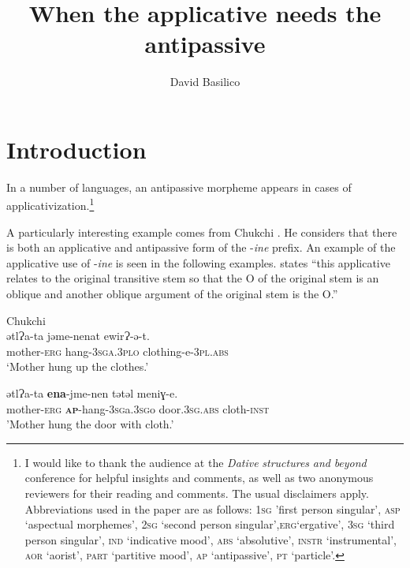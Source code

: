 \documentclass[output=paper,modfonts,nonflat,newtxmath]{langsci/langscibook}
\author{David Basilico\affiliation{University of Alabama at Birmingham}}
\title{When the applicative needs the antipassive}
\begin{document}
\maketitle  


\section{Introduction} %

In a number of languages, an antipassive morpheme appears in cases of applicativization.\footnote{I would like to thank the audience at the \textit{Dative} \textit{structures} \textit{and} \textit{beyond} conference for helpful insights and comments, as well as two anonymous reviewers for their reading and comments. The usual disclaimers apply. Abbreviations used in the paper are as follows:
1\textsc{sg} 'first person singular', \textsc{asp} `aspectual morphemes', \textsc{2sg} `second person singular',\textsc{erg}`ergative', \textsc{3sg} `third person singular', \textsc{ind} `indicative mood', \textsc{abs} `absolutive', \textsc{instr} `instrumental', \textsc{aor} `aorist', {\textsc{part}} `partitive mood', {\textsc{ap}} `antipassive', \textsc{pt} `particle'.}
 
 A particularly interesting example comes from Chukchi \citep{Dunn1999}. He considers that there is both an applicative and antipassive form of the -\textit{ine} prefix. An example of the applicative use of -\textit{ine} is seen in the following examples. \citet[214]{Dunn1999} states “this applicative relates to the original transitive stem so that the O of the original stem is an oblique and another oblique argument of the original stem is the O.” 

\ea%
	Chukchi \citep{Dunn1999}\\
    \label{ex:basilico:1}
    \ea \label{ex:basilico:1a}
    \gll ǝtlɁa-ta  jǝme-nenat    ewirɁ-ǝ-t.\\
        mother-\textsc{erg}  hang-\textsc{3sga}.\textsc{3plo} clothing-e-\textsc{3pl}.\textsc{abs}\\
    \glt ‘Mother hung up the clothes.’  
    
    \ex \label{ex:basilico:1b}
    \gll ǝtlɁa-ta \textbf{ena}-jme-nen tǝtǝl meniɣ-e.\\
    mother-\textsc{erg}  \textbf{\textsc{ap}}-hang-\textsc{3sg}a.\textsc{3sg}o  door.\textsc{3sg}.\textsc{abs} cloth-\textsc{inst}\\
    \glt 'Mother hung the door with cloth.'
    \z
    \z
    
\end{document}
